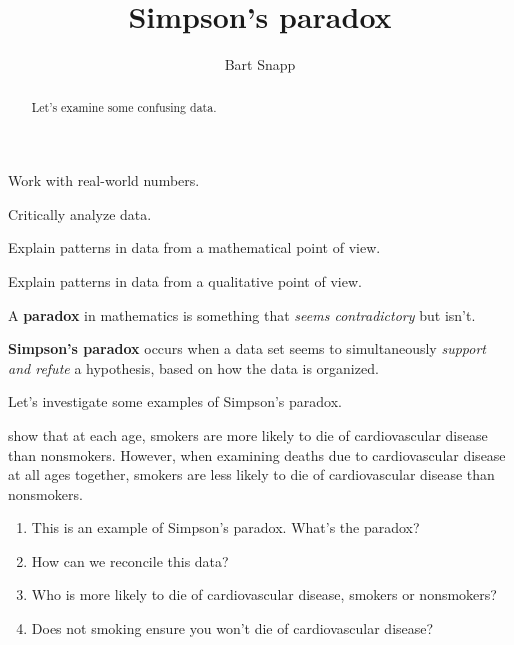 \documentclass[nooutcomes,noauthor,hints,handout]{ximera}
\title{Simpson's paradox}
\author{Bart Snapp}
\begin{document}
\begin{abstract}
  Let's examine some confusing data.
\end{abstract}
\maketitle

\begin{listOutcomes}
\item Work with real-world numbers.
\item Critically analyze data.
\item Explain patterns in data from a mathematical point of view.
\item Explain patterns in data from a qualitative point of view.
\end{listOutcomes}


A \textbf{paradox} in mathematics is something that \textit{seems
contradictory} but isn't.



\textbf{Simpson's paradox} occurs when a data set seems to
simultaneously \textit{support and refute} a hypothesis, based on how
the data is organized.



Let's investigate some examples of Simpson's paradox. 


\mynewpage



\begin{question}

  show that at each age, smokers are more likely to die of
  cardiovascular disease than nonsmokers.  However, when examining
  deaths due to cardiovascular disease at all ages together, smokers
  are less likely to die of cardiovascular disease than nonsmokers.

\begin{enumerate}
\item This is an example of Simpson's paradox. What's the paradox?
\item How can we reconcile this data?
\item Who is more likely to die of cardiovascular disease, smokers or
  nonsmokers?
\item Does not smoking ensure you won't die of cardiovascular disease?
\end{enumerate}
\end{question}
\mynewpage
\end{document}
